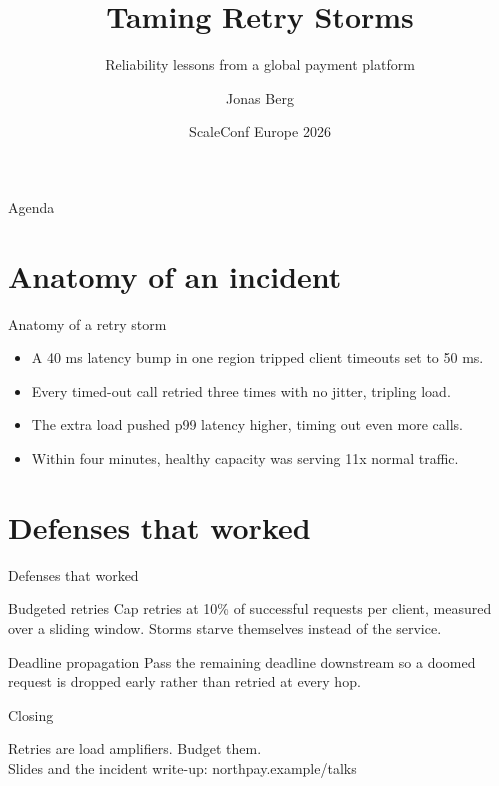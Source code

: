 \documentclass[aspectratio=169]{beamer}
\title[Taming Retry Storms]{Taming Retry Storms}
\subtitle{Reliability lessons from a global payment platform}
\author[J. Berg]{Jonas Berg}
\institute[Northpay]{Site Reliability Engineering, Northpay}
\date{ScaleConf Europe 2026}
\begin{document}
\begin{frame}
  \titlepage
\end{frame}

\begin{frame}{Agenda}
  \tableofcontents
\end{frame}

\section{Anatomy of an incident}

\begin{frame}{Anatomy of a retry storm}
  \begin{itemize}
    \item A 40 ms latency bump in one region tripped client timeouts set to 50 ms.
    \item Every timed-out call retried three times with no jitter, tripling load.
    \item The extra load pushed p99 latency higher, timing out even more calls.
    \item Within four minutes, healthy capacity was serving 11x normal traffic.
  \end{itemize}
\end{frame}

\section{Defenses that worked}

\begin{frame}{Defenses that worked}
  \begin{block}{Budgeted retries}
    Cap retries at 10\% of successful requests per client, measured over a
    sliding window. Storms starve themselves instead of the service.
  \end{block}
  \begin{block}{Deadline propagation}
    Pass the remaining deadline downstream so a doomed request is dropped
    early rather than retried at every hop.
  \end{block}
\end{frame}

\begin{frame}{Closing}
  \begin{center}
    {\Large Retries are load amplifiers. Budget them.}\\[1em]
    Slides and the incident write-up: northpay.example/talks
  \end{center}
\end{frame}
\end{document}
